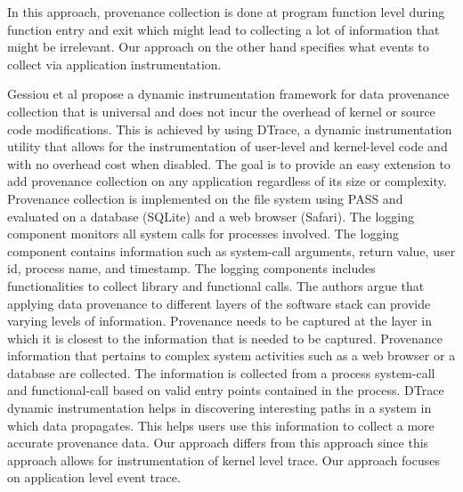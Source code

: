 
In this approach, provenance collection is done at program function level during function entry and exit which might lead to collecting a lot of information that might be irrelevant. Our approach on the other hand specifies what events to collect via application instrumentation. 


Gessiou et al \cite{gessiou_towards_2012} propose a dynamic instrumentation framework for data provenance collection that is universal and does not incur the overhead of kernel or source code modifications. This is achieved by using DTrace, a dynamic instrumentation utility that allows for the instrumentation of user-level and kernel-level code and with no overhead cost when disabled. The goal is to provide an easy extension to add provenance collection on any application regardless of its size or complexity. Provenance collection is implemented on the file system using PASS and evaluated on a database (SQLite) and a web browser (Safari). 
The logging component monitors all system calls for processes involved. The logging component contains information such as system-call arguments, return value, user id, process name, and timestamp. The logging components includes functionalities to collect library and functional calls. The authors argue that applying data provenance to different layers of the software stack can provide varying levels of information. Provenance needs to be captured at the layer in which it is closest to the information that is needed to be captured. Provenance information that pertains to complex system activities such as a web browser or a database are collected. The information is collected from a process system-call and functional-call based on valid entry points contained in the process. DTrace dynamic instrumentation helps in discovering interesting paths in a system in which data propagates. This helps users use this information to collect a more accurate provenance data. Our approach differs from this approach since this approach allows for instrumentation of kernel level trace. Our approach focuses on application level event trace.


